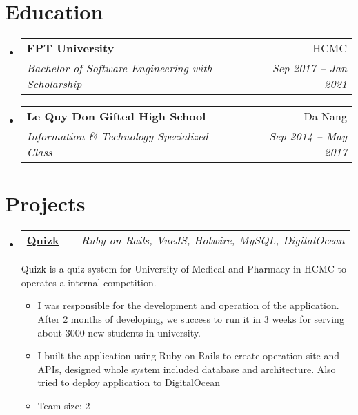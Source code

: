 \documentclass[a4paper,11pt]{article}
\makeatletter
\newcommand{\resumeItem}[1]{
  \item\small{#1}
}
\newcommand{\resumeItemListStart}{\begin{itemize}[rightmargin=0.11in]}
\newcommand{\resumeItemListEnd}{\end{itemize}}
\newcommand{\resumeTrioHeading}[3]{
  \item\small{
    \begin{tabular*}{0.96\textwidth}[t]{
      l@{\extracolsep{\fill}}c@{\extracolsep{\fill}}r
    }
      \textbf{#1} & \textit{#2} & \textit{#3}
      \smallskip
    \end{tabular*}
  }
}
\newcommand{\resumeQuadHeading}[4]{
  \item
  \begin{tabular*}{0.96\textwidth}[t]{l@{\extracolsep{\fill}}r}
    \textbf{\normalsize#1} & #2 \\
    \textit{\small#3} & \textit{\small #4}
    \smallskip
  \end{tabular*}
}
\newcommand{\resumeHeadingListStart}{
  \begin{itemize}[leftmargin=0.15in, label={}]
}
\newcommand{\resumeHeadingListEnd}{\end{itemize}}
\makeatother
\begin{document}
\section{Education}
  \resumeHeadingListStart{}
    \resumeQuadHeading{FPT University}{HCMC}
    {Bachelor of Software Engineering with Scholarship}{Sep 2017 -- Jan 2021}
    \resumeQuadHeading{Le Quy Don Gifted High School}{Da Nang}
    {Information \& Technology Specialized Class}{Sep 2014 -- May 2017}
  \resumeHeadingListEnd{}



\section{Projects}
  \resumeHeadingListStart{}
    \resumeTrioHeading{\href{https://github.com/quizk}{Quizk}}{}{Ruby on Rails, VueJS, Hotwire, MySQL, DigitalOcean}
    \small{Quizk is a quiz system for University of Medical and Pharmacy in HCMC to operates a internal competition.}
      \resumeItemListStart{}
        \resumeItem{I was responsible for the development and operation of the application. After 2 months of developing, we success to run it in 3 weeks for serving about 3000 new students in university.}
        \resumeItem{I built the application using Ruby on Rails to create operation site and APIs, designed whole system included database and architecture. Also tried to deploy application to DigitalOcean}
        \resumeItem{Team size: 2}
      \resumeItemListEnd{}
  \resumeHeadingListEnd{}
\end{document}

